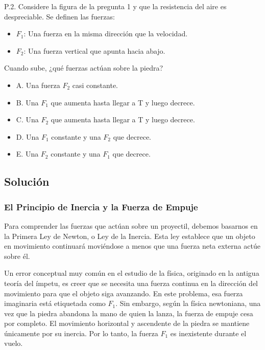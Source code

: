 \documentclass[12pt, a4paper]{article}
\begin{document}
P.2. Considere la figura de la pregunta 1 y que la resistencia del aire es despreciable. Se definen las fuerzas:

\begin{itemize}
    \item $F_1$: Una fuerza en la misma dirección que la velocidad.
    \item $F_2$: Una fuerza vertical que apunta hacia abajo.
\end{itemize}

Cuando sube, ¿qué fuerzas actúan sobre la piedra?

\begin{itemize}
    \item A. Una fuerza $F_2$ casi constante.
    \item B. Una $F_1$ que aumenta hasta llegar a T y luego decrece.
    \item C. Una $F_2$ que aumenta hasta llegar a T y luego decrece.
    \item D. Una $F_1$ constante y una $F_2$ que decrece.
    \item E. Una $F_2$ constante y una $F_1$ que decrece.
\end{itemize}

\subsection*{Solución}

\subsubsection*{El Principio de Inercia y la Fuerza de Empuje}

Para comprender las fuerzas que actúan sobre un proyectil, debemos basarnos en la Primera Ley de Newton, o Ley de la Inercia. Esta ley establece que un objeto en movimiento continuará moviéndose a menos que una fuerza neta externa actúe sobre él. 

Un error conceptual muy común en el estudio de la física, originado en la antigua teoría del ímpetu, es creer que se necesita una fuerza continua en la dirección del movimiento para que el objeto siga avanzando. En este problema, esa fuerza imaginaria está etiquetada como $F_1$. Sin embargo, según la física newtoniana, una vez que la piedra abandona la mano de quien la lanza, la fuerza de empuje cesa por completo. El movimiento horizontal y ascendente de la piedra se mantiene únicamente por su inercia. Por lo tanto, la fuerza $F_1$ es inexistente durante el vuelo.
\end{document}
